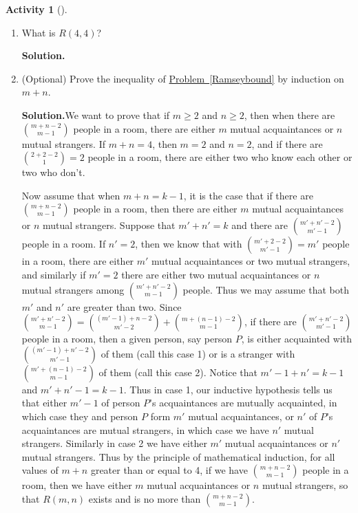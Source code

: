 \documentclass[10pt,]{book}
\theoremstyle{plain}
\theoremstyle{definition}
\newtheorem{activity}[project]{Activity}
\numberwithin{equation}{chapter}
\begin{document}
\begin{activity}[]
\begin{enumerate}[label=(\alph*)]
~\par
\item What is \(R(4,4)\)?%
\par\medskip\noindent%
\textbf{Solution.}\quad 
~\par
\item (Optional) Prove the inequality of \hyperref[Ramseybound]{Problem~\ref{Ramseybound}} by induction on \(m+n\).%
\par\medskip\noindent%
\textbf{Solution.}\quad We want to prove that if \(m\ge 2\) and \(n\ge 2\), then when there are \(\binom{m+n-2}{m-1}\) people in a room, there are either \(m\) mutual acquaintances or \(n\) mutual strangers. If \(m+n=4\), then \(m=2\) and \(n=2\), and if there are \(\binom{2+2-2}{1}=2\) people in a room, there are either two who know each other or two who don't.%
\par
Now assume that when \(m+n=k-1\), it is the case that if there are \(\binom{m+n-2}{m-1}\) people in a room, then there are either \(m\) mutual acquaintances or \(n\) mutual strangers. Suppose that \(m'+n'=k\) and there are \(\binom{m'+n'-2}{m'-1}\) people in a room. If \(n'=2\), then we know that with \(\binom{m'+2-2}{m'-1}=m'\) people in a room, there are either \(m'\) mutual acquaintances or two mutual strangers, and similarly if \(m'=2\) there are either two mutual acquaintances or \(n\) mutual strangers among \(\binom{m'+n'-2}{m-1}\) people. Thus we may assume that both \(m'\) and \(n'\) are greater than two. Since \(\binom{m'+n'-2}{m-1}=
\binom{(m'-1)+n-2}{m'-2} +\binom{m+(n-1) -2}{m-1}\), if there are \(\binom{m'+n'-2}{m'-1}\) people in a room, then a given person, say person \(P\), is either acquainted with \(\binom{(m'-1)+n'-2}{m'-1}\) of them (call this case 1) or is a stranger with \(\binom{m'+(n-1)-2}{m-1}\) of them (call this case 2). Notice that \(m'-1+n'=k-1\) and \(m'+n'-1=k-1\). Thus in case 1, our inductive hypothesis tells us that either \(m'-1\) of person \(P\)'s acquaintances are mutually acquainted, in which case they and person \(P\) form \(m'\) mutual acquaintances, or \(n'\) of \(P\)'s acquaintances are mutual strangers, in which case we have \(n'\) mutual strangers. Similarly in case 2 we have either \(m'\) mutual acquaintances or \(n'\) mutual strangers. Thus by the principle of mathematical induction, for all values of \(m+n\) greater than or equal to 4, if we have \(\binom{m+n-2}{m-1}\) people in a room, then we have either \(m\) mutual acquaintances or \(n\) mutual strangers, so that \(R(m,n)\) exists and is no more than \(\binom{m+n-2}{m-1}\).%


\end{enumerate}
\end{activity}
\end{document}
